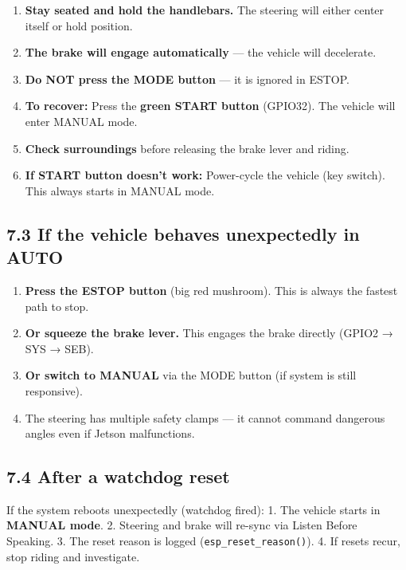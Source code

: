 \documentclass[12pt,a4paper,oneside]{report}
\providecommand{\tightlist}{\setlength{\itemsep}{0pt}\setlength{\parskip}{0pt}}
\begin{document}
\begin{enumerate}
\def\labelenumi{\arabic{enumi}.}
\tightlist
\item
  \textbf{Stay seated and hold the handlebars.} The steering will either center
  itself or hold position.
\item
  \textbf{The brake will engage automatically} --- the vehicle will decelerate.
\item
  \textbf{Do NOT press the MODE button} --- it is ignored in ESTOP.
\item
  \textbf{To recover:} Press the \textbf{green START button} (GPIO32). The
  vehicle will enter MANUAL mode.
\item
  \textbf{Check surroundings} before releasing the brake lever and riding.
\item
  \textbf{If START button doesn't work:} Power-cycle the vehicle (key switch).
  This always starts in MANUAL mode.
\end{enumerate}

\subsection{7.3 If the vehicle behaves unexpectedly in
AUTO}\label{if-the-vehicle-behaves-unexpectedly-in-auto}

\begin{enumerate}
\def\labelenumi{\arabic{enumi}.}
\tightlist
\item
  \textbf{Press the ESTOP button} (big red mushroom). This is always the fastest
  path to stop.
\item
  \textbf{Or squeeze the brake lever.} This engages the brake directly (GPIO2 →
  SYS → SEB).
\item
  \textbf{Or switch to MANUAL} via the MODE button (if system is still
  responsive).
\item
  The steering has multiple safety clamps --- it cannot command dangerous angles
  even if Jetson malfunctions.
\end{enumerate}

\subsection{7.4 After a watchdog reset}\label{after-a-watchdog-reset}

If the system reboots unexpectedly (watchdog fired): 1. The vehicle starts in
\textbf{MANUAL mode}. 2. Steering and brake will re-sync via Listen Before
Speaking. 3. The reset reason is logged (\texttt{esp\_reset\_reason()}). 4. If
resets recur, stop riding and investigate.
\end{document}
